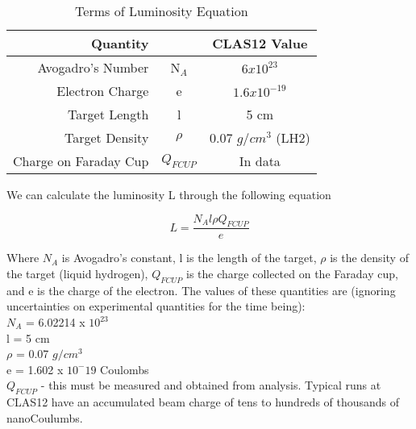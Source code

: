 \begin{table}[h]
    \centering
    \begin{tabular}{rcc}
        Quantity &  & CLAS12 Value \\\hline
       Avogadro's Number &  N$_A$  & $6x10^{23}$ \\
        Electron Charge &e  &  $1.6x10^{-19}$ \\
        Target Length &l &  5 cm \\
        Target Density &$\rho$  &  0.07 $g/cm^3$ (LH2) \\
        Charge on Faraday Cup & $Q_{FCUP}$ &  In data\\
    \end{tabular}
\caption{Terms of Luminosity Equation}
\end{table}\label{lumitable}


We can calculate the luminosity L through the following equation

\begin{equation}
    L = \frac{N_A l \rho Q_{FCUP}}{e}
\end{equation}

Where $N_A$ is Avogadro's constant, l is the length of the target,  $\rho$ is the density of the target (liquid hydrogen), $Q_{FCUP}$ is the charge collected on the Faraday cup, and e is the charge of the electron. The values of these quantities are (ignoring uncertainties on experimental quantities for the time being):\\

$N_A$ = 6.02214 x $10^{23}$\\
l = 5 cm\\
$\rho$ = 0.07 $g/cm^3$\\
e = 1.602 x $10^-19$ Coulombs\\
$Q_{FCUP}$ - this must be measured and obtained from analysis. Typical runs at CLAS12 have an accumulated beam charge of tens to hundreds of thousands of nanoCoulumbs. 
